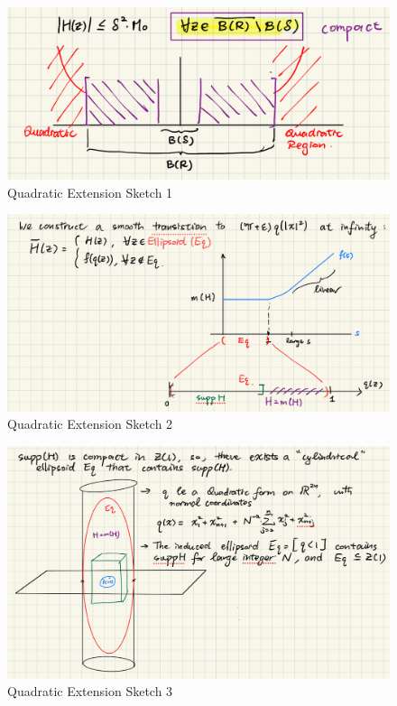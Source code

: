\documentclass[../main-v2-manifolds.tex]{subfiles}
\begin{document}
\begin{figure}
    \centering
    \includegraphics[width=0.75\linewidth]{images/quadratic-extension-sketch-1.png}
    \caption{Quadratic Extension Sketch 1}
    \label{fig:quadratic-extension-sketch-1}
\end{figure}
\begin{figure}
    \centering
    \includegraphics[width=0.75\linewidth]{images/quadratic-extension-sketch-2.png}
    \caption{Quadratic Extension Sketch 2}
    \label{fig:quadratic-extension-sketch-2}
\end{figure}
\begin{figure}
    \centering
    \includegraphics[width=0.75\linewidth]{images/quadratic-extension-sketch-3.png}
    \caption{Quadratic Extension Sketch 3}
    \label{fig:quadratic-extension-sketch-3}
\end{figure}
\end{document}
